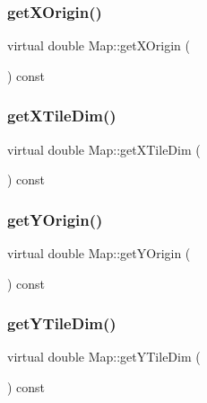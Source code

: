 \subsubsection{\texorpdfstring{get\+X\+Origin()}{getXOrigin()}}
{\footnotesize\ttfamily virtual double Map\+::get\+X\+Origin (\begin{DoxyParamCaption}{ }\end{DoxyParamCaption}) const\hspace{0.3cm}{\ttfamily [virtual]}}

\mbox{\label{class_map_a0a7326f8167effc1b6c0329de3c29d60}} 
\subsubsection{\texorpdfstring{get\+X\+Tile\+Dim()}{getXTileDim()}}
{\footnotesize\ttfamily virtual double Map\+::get\+X\+Tile\+Dim (\begin{DoxyParamCaption}{ }\end{DoxyParamCaption}) const\hspace{0.3cm}{\ttfamily [virtual]}}

\mbox{\label{class_map_a5bf4ef0a81f82df90465136c61a440bc}} 
\subsubsection{\texorpdfstring{get\+Y\+Origin()}{getYOrigin()}}
{\footnotesize\ttfamily virtual double Map\+::get\+Y\+Origin (\begin{DoxyParamCaption}{ }\end{DoxyParamCaption}) const\hspace{0.3cm}{\ttfamily [virtual]}}

\mbox{\label{class_map_af36385173af71e8e0cd989dceb8f8aea}} 
\subsubsection{\texorpdfstring{get\+Y\+Tile\+Dim()}{getYTileDim()}}
{\footnotesize\ttfamily virtual double Map\+::get\+Y\+Tile\+Dim (\begin{DoxyParamCaption}{ }\end{DoxyParamCaption}) const\hspace{0.3cm}{\ttfamily [virtual]}}

